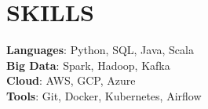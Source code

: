\section{SKILLS}
\begin{itemize}[leftmargin=0in, label={}]
    \small{\item{
     \textbf{Languages}{: Python, SQL, Java, Scala}\vspace{2pt} \\
     \textbf{Big Data}{: Spark, Hadoop, Kafka}\vspace{2pt} \\
     \textbf{Cloud}{: AWS, GCP, Azure}\vspace{2pt} \\
     \textbf{Tools}{: Git, Docker, Kubernetes, Airflow}
    }}
\end{itemize} 